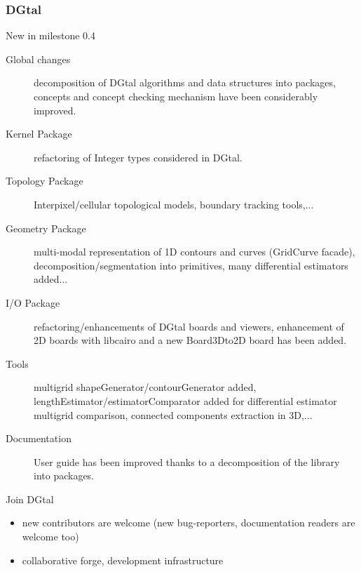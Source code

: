 \documentclass[8pt]{beamer}
\begin{document}
\begin{frame}%
  \frametitle{DGtal}
\small
  \begin{block}{ New in milestone 0.4}
    \small
    \begin{description}
        \item[Global changes] decomposition of DGtal algorithms and
        data structures into packages, concepts and concept checking mechanism have been
        considerably improved.
      \item[Kernel Package] refactoring of Integer types considered in DGtal.
       \item[Topology Package] Interpixel/cellular topological models, boundary tracking tools,...
       \item[Geometry Package] multi-modal representation of 1D
         contours and curves (GridCurve facade), decomposition/segmentation into primitives,
        many differential estimators added...
       \item [I/O Package] refactoring/enhancements of DGtal boards and viewers, enhancement of 2D boards with libcairo and a new Board3Dto2D board has been added.
       \item [Tools] multigrid shapeGenerator/contourGenerator added, lengthEstimator/estimatorComparator added for differential estimator multigrid comparison, connected components extraction in 3D,...
       \item [Documentation] User guide has been improved thanks to a decomposition of the library into packages.
\end{description}
  \end{block}

  \begin{alertblock}{Join DGtal}
    \small
    \begin{itemize}
    \item new contributors are welcome (new bug-reporters, documentation readers are welcome too)
    \item collaborative forge, development infrastructure
    \end{itemize}
  \end{alertblock}
  
\end{frame}



\end{document}

